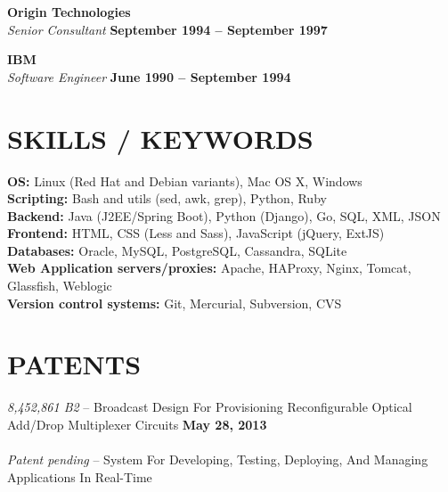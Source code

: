\documentclass[margin,line]{resume}
\begin{document}
\begin{resume}
    \textbf{\listing Origin Technologies} \vspace{2mm}\\\vspace{1mm}%
    \textsl{Senior Consultant} \hfill \textbf{September 1994 -- September 1997}
    

    \textbf{\listing IBM} \vspace{2mm}\\\vspace{1mm}%
    \textsl{Software Engineer} \hfill \textbf{June 1990 -- September 1994}\\
    

    \vspace{-1mm}

\sectionline

    \section{\mysidestyle \textbf{\large{S}\small{KILLS} / \large{K}\small{EYWORDS}}}
    \textbf{OS:} Linux (Red Hat and Debian variants), Mac OS X, Windows \\
    \textbf{Scripting:} Bash and utils (sed, awk, grep), Python, Ruby\\
    \textbf{Backend:} Java (J2EE/Spring Boot), Python (Django), Go, SQL, XML, JSON\\
    \textbf{Frontend:} HTML, CSS (Less and Sass), JavaScript (jQuery, ExtJS)\\
    \textbf{Databases:} Oracle, MySQL, PostgreSQL, Cassandra, SQLite\\
    \textbf{Web Application servers/proxies:} Apache, HAProxy, Nginx, Tomcat, Glassfish, Weblogic\\
    \textbf{Version control systems:} Git, Mercurial, Subversion, CVS\\

\sectionline

    \section{\mysidestyle \textbf{\large{P}\small{ATENTS}}}
    \textsl{8,452,861 B2} -- Broadcast Design For Provisioning Reconfigurable Optical Add/Drop Multiplexer Circuits \hfill \textbf{May 28, 2013}\\\\
    \textsl{Patent pending} -- System For Developing, Testing, Deploying, And Managing Applications In Real-Time\\
    \vspace{-4mm}


\end{resume}
\end{document}
